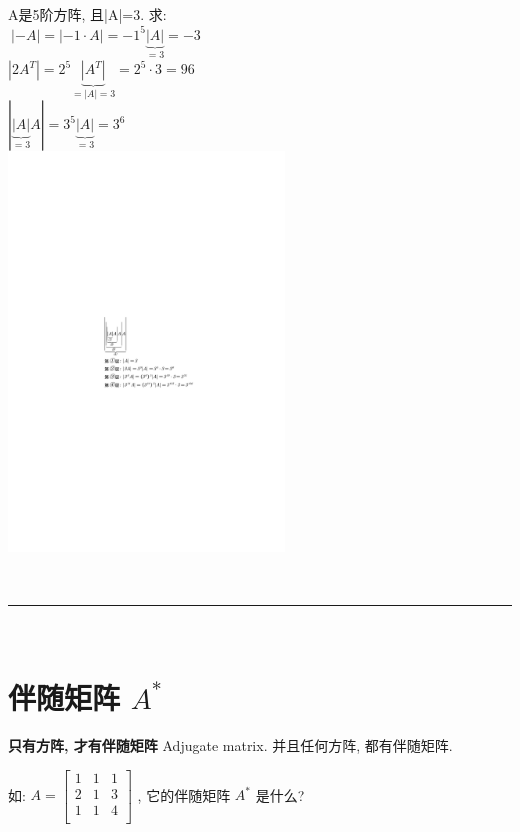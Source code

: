 \documentclass[UTF8]{ctexart}
\begin{document}
\begin{myEnvSample}
A是5阶方阵, 且|A|=3. 求:  \\
$
\ |-A|=|-1\cdot A|=-1^5\underset{=3}{\underbrace{|A|}}=-3
$\\
$
|2A^T|=2^5\underset{=|A|=3}{\underbrace{|A^T|}}=2^5\cdot 3=96
$\\
$
\left| \underset{=3}{\underbrace{\left| A \right|}}A \right|=3^5\underset{=3}{\underbrace{|A|}}=3^6
$\\

\includegraphics[width=0.55\textwidth]{img/0024.pdf}
\end{myEnvSample}



~\\
\hrule
~\\


\section{伴随矩阵  $A^*$}


\textbf{只有方阵, 才有伴随矩阵} Adjugate matrix. 并且任何方阵, 都有伴随矩阵.

如: $A=\left[ \begin{matrix}
	1&		1&		1\\
	\hline
	2&		1&		3\\
	\hline
	1&		1&		4\\
\end{matrix} \right] $ , 它的伴随矩阵 $A^*$ 是什么? \\
\end{document}
